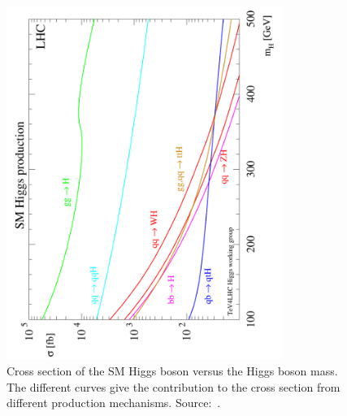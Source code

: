 \begin{figure}
  \centering
  \includegraphics[width=90mm,angle=270]{theory_chapter/figures/lhcxs_mh.pdf}
  \caption[SM Higgs boson cross sections at the LHC]{Cross section of the SM Higgs
  boson versus the Higgs boson mass.  The different curves give the contribution
  to the cross section from different production mechanisms.
  Source:~\cite{PDG}.} \label{fig:LHCSMHiggsXsec}
\end{figure}

